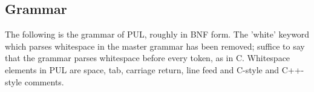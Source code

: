 \subsection{Grammar}

The following is the grammar of PUL, roughly in BNF form. The 'white' keyword which parses whitespace in the master grammar has been removed; suffice to say that the grammar parses whitespace before every token, as in C. Whitespace elements in PUL are space, tab, carriage return, line feed and C-style and C++-style comments.



\begin{comment}
<p class="P27">  plof_statements = plof_statements_sub

<p class="P27">  plof_statements = white



<p class="P27">  plof_statements_sub = plof_statement

<p class="P27">  plof_statements_sub = plof_statements_sub plof_statement



<p class="P27">  plof_statement = plof_comma /;/

<p class="P27">  plof_statement = pslbnf // pslbnf is a method of encoding Plof grammars



<p class="P27">  plof_semicolon = plof_statements

<p class="P27">  plof_semicolon = plof_comma

<p class="P27">  plof_semicolon = plof_statements plof_comma



<p class="P27">  plof_comma = plof_assign

<p class="P27">  plof_comma = plof_comma /,/ plof_assign



<p class="P27">  plof_assign = plof_or

<p class="P27">  plof_assign = plof_or /=/ plof_or





<p class="P27">  plof_or = plof_and

<p class="P27">  plof_or = plof_or /\|\|/ plof_and



<p class="P27">  plof_and = plof_equal

<p class="P27">  plof_and = plof_and /\&amp;\&amp;/ plof_equal




\end{comment}

